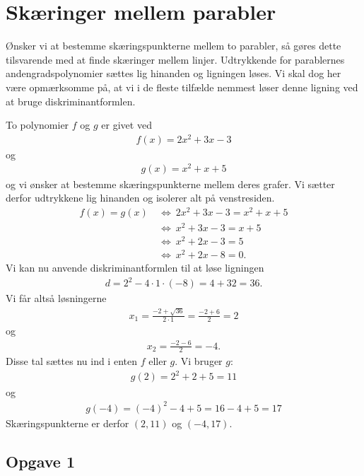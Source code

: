 \section*{Skæringer mellem parabler}

Ønsker vi at bestemme skæringspunkterne mellem to parabler, så gøres dette tilsvarende med at finde skæringer mellem linjer. Udtrykkende for parablernes andengradspolynomier sættes lig hinanden og ligningen løses. Vi skal dog her være opmærksomme på, at vi i de fleste tilfælde nemmest løser denne ligning ved at bruge diskriminantformlen.

\begin{exa}
To polynomier $f$ og $g$ er givet ved
\begin{align*}
	f(x) = 2x^2 + 3x - 3
\end{align*}
og
\begin{align*}
	g(x) = x^2 + x + 5
\end{align*}
og vi ønsker at bestemme skæringspunkterne mellem deres grafer. Vi sætter derfor udtrykkene lig hinanden og isolerer alt på venstresiden.
\begin{align*}
	f(x) = g(x)\ &\Leftrightarrow \ 2x^2 + 3x - 3 = x^2 + x + 5 \\
	&\Leftrightarrow \ x^2 + 3x - 3 = x + 5 \\
	&\Leftrightarrow \ x^2 + 2x - 3 = 5 \\
	&\Leftrightarrow \ x^2 + 2x - 8 = 0.
\end{align*}
Vi kan nu anvende diskriminantformlen til at løse ligningen
\begin{align*}
	d = 2^2 - 4\cdot 1 \cdot (-8) = 4 +32 = 36.
\end{align*}
Vi får altså løsningerne
\begin{align*}
	x_1 = \frac{-2 + \sqrt{36}}{2\cdot 1} = \frac{-2+6}{2} = 2
\end{align*}
og 
\begin{align*}
	x_2 = \frac{-2-6}{2} = - 4.
\end{align*}
Disse tal sættes nu ind i enten $f$ eller $g$. Vi bruger $g$:
\begin{align*}
	g(2) = 2^2 + 2 + 5 = 11
\end{align*}
og 
\begin{align*}
	g(-4) = (-4)^2 -4 + 5 = 16 -4 + 5 = 17
\end{align*}
Skæringspunkterne er derfor $(2,11)$ og $(-4,17)$.
\end{exa}

\subsection*{Opgave 1}

